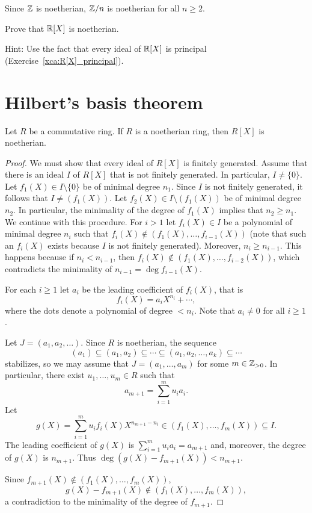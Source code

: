 Since $\mathbb{Z}$ is noetherian, $\mathbb{Z}/n$ is noetherian for all $n\geq2$. 

\begin{exercise}
\label{xca:R[X]_noetherian}
	Prove that $\mathbb{R}[X]$ is noetherian. 	
\end{exercise}

Hint: Use the fact that every ideal of $\mathbb{R}[X]$ is principal
(Exercise~\ref{xca:R[X]_principal}).  

\section{Hilbert's basis theorem}

\begin{theorem}[Hilbert]
	Let $R$ be a commutative ring. If $R$ is a noetherian ring, then $R[X]$ is noetherian.	
\end{theorem}

\begin{proof}
	We must show that every ideal of $R[X]$ is finitely generated. Assume that
	there is an ideal $I$ of $R[X]$ that is not finitely generated. In particular, $I\ne\{0\}$. 
	Let $f_1(X)\in I\setminus\{0\}$ be of minimal degree $n_1$. 
	Since $I$ is not finitely generated, it follows that 
	$I\ne (f_1(X))$. Let $f_2(X)\in I\setminus (f_1(X))$ be
	of minimal degree $n_2$. In particular, the minimality of the degree of $f_1(X)$ implies that 
	$n_2\geq n_1$. 
	We continue with this procedure. For $i>1$ let 
	$f_i(X)\in I$ be a polynomial of minimal degree $n_i$   
	such that $f_i(X)\not\in(f_1(X),\dots,f_{i-1}(X))$ (note
	that such an $f_i(X)$ exists because $I$ is not finitely generated). 
	Moreover, $n_i\geq n_{i-1}$. This happens because 
	if $n_i<n_{i-1}$, then
	$f_i(X)\not\in (f_1(X),\dots,f_{i-2}(X))$, which contradicts
	the minimality of $n_{i-1}=\deg f_{i-1}(X)$. 

	For each $i\geq1$ 
	let $a_i$ be the leading coefficient of $f_i(X)$, that is
	\[
	f_i(X)=a_iX^{n_i}+\cdots,
	\]
	where the dots denote a polynomial of 
	degree $<n_i$. Note that 
	$a_i\ne 0$ for all $i\geq 1$. 
	
	Let $J=(a_1,a_2,\dots)$. Since $R$ is noetherian, the sequence
	\[
	(a_1)\subseteq (a_1,a_2)\subseteq\cdots\subseteq(a_1,a_2,\dots,a_k)\subseteq\cdots
	\]
	stabilizes, so we may assume that 
	$J=(a_1,\dots,a_m)$ for some $m\in\mathbb{Z}_{>0}$. 
	In particular, there exist $u_1,\dots,u_m\in R$ such that 
	\[
	a_{m+1}=\sum_{i=1}^m u_ia_i.
	\]
	Let 
	\[
	g(X)=\sum_{i=1}^mu_if_i(X)X^{n_{m+1}-n_i}\in (f_1(X),\dots,f_m(X))\subseteq I.
	\]
	The leading coefficient of $g(X)$ is $\sum_{i=1}^mu_ia_i=a_{m+1}$ and, moreover, 
	the degree of $g(X)$ is $n_{m+1}$. Thus $\deg(g(X)-f_{m+1}(X))<n_{m+1}$. 
	
	Since $f_{m+1}(X)\not\in (f_1(X),\dots,f_m(X))$, 
	\[
	g(X)-f_{m+1}(X)\not\in (f_1(X),\dots,f_m(X)),
	\]
	a contradiction to the minimality of the degree of $f_{m+1}$.  
\end{proof}

